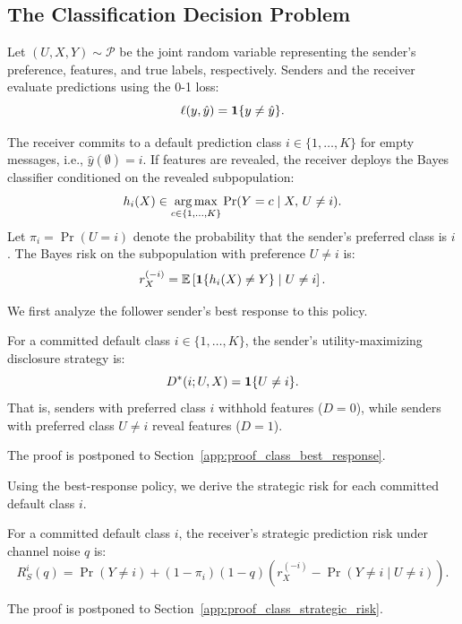 \subsection{The Classification Decision Problem}
\label{sec:classification_decision}
Let $(U, X, Y) \sim \mathcal{P}$ be the joint random variable representing the sender's preference, features, and true labels, respectively. Senders and the receiver evaluate predictions using the 0-1 loss:
\begin{equation}
    \ell(y, \hat{y}) = \mathbf{1}\{y \ne \hat{y}\}.
\end{equation}

The receiver commits to a default prediction class $i \in \{1, \dots, K\}$ for empty messages, i.e., $\hat{y}(\emptyset) = i$. If features are revealed, the receiver deploys the Bayes classifier conditioned on the revealed subpopulation:
\begin{equation}
    \label{eq:bayes_classifier}
    h_i(X) \in \operatorname*{arg\,max}_{c \in \{1, \dots, K\}} \Pr(Y = c \mid X, \, U \ne i).
\end{equation}
Let $\pi_i = \Pr(U = i)$ denote the probability that the sender's preferred class is $i$. The Bayes risk on the subpopulation with preference $U \ne i$ is:
\begin{equation}
    \label{eq:bayes_risk_def}
    r^{(-i)}_X = \mathbb{E}\left[ \mathbf{1}\{h_i(X) \ne Y\} \;\middle|\; U \ne i \right].
\end{equation}

We first analyze the follower sender's best response to this policy.
\begin{lemma}
\label{lem:class_best_response}
For a committed default class $i \in \{1, \dots, K\}$, the sender's utility-maximizing disclosure strategy is:
\begin{equation}
    \label{eq:class_best_response}
    D^*(i; U, X) = \mathbf{1}\{U \ne i\}.
\end{equation}
That is, senders with preferred class $i$ withhold features ($D = 0$), while senders with preferred class $U \ne i$ reveal features ($D = 1$).
\end{lemma}
The proof is postponed to Section~\ref{app:proof_class_best_response}.

Using the best-response policy, we derive the strategic risk for each committed default class $i$.
\begin{lemma}
\label{lem:class_strategic_risk}
For a committed default class $i$, the receiver's strategic prediction risk under channel noise $q$ is:
\begin{equation}
    \label{eq:class_strategic_risk}
    R^i_S(q) = \Pr(Y \ne i) + (1 - \pi_i)(1 - q)\left( r^{(-i)}_X - \Pr(Y \ne i \mid U \ne i) \right).
\end{equation}
\end{lemma}
The proof is postponed to Section~\ref{app:proof_class_strategic_risk}.

